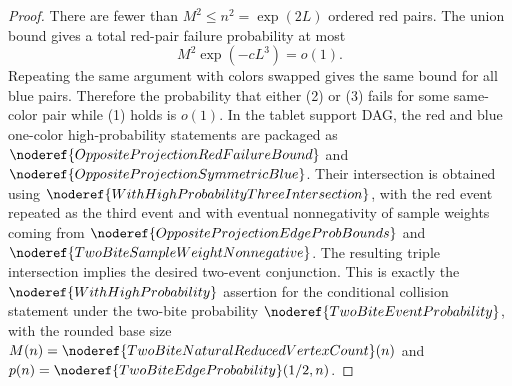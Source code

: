 \begin{proof}
There are fewer than \(M^2\le n^2=\exp(2L)\) ordered red pairs.  The union
bound gives a total red-pair failure probability at most
\[
M^2\exp(-cL^3)=o(1).
\]
Repeating the same argument with colors swapped gives the same bound for all
blue pairs.  Therefore the probability that either (2) or (3) fails for some
same-color pair while (1) holds is \(o(1)\).  In the tablet support DAG, the
red and blue one-color high-probability statements are packaged as
\(\noderef{OppositeProjectionRedFailureBound}\) and
\(\noderef{OppositeProjectionSymmetricBlue}\).  Their intersection is obtained
using \(\noderef{WithHighProbabilityThreeIntersection}\), with the red event
repeated as the third event and with eventual nonnegativity of sample weights
coming from \(\noderef{OppositeProjectionEdgeProbBounds}\) and
\(\noderef{TwoBiteSampleWeightNonnegative}\).  The resulting triple
intersection implies the desired two-event conjunction.  This is exactly the
\(\noderef{WithHighProbability}\) assertion for the conditional collision
statement under the two-bite probability
\(\noderef{TwoBiteEventProbability}\), with the rounded base size
\(M(n)=\noderef{TwoBiteNaturalReducedVertexCount}(n)\) and
\(p(n)=\noderef{TwoBiteEdgeProbability}(1/2,n)\).
\end{proof}
